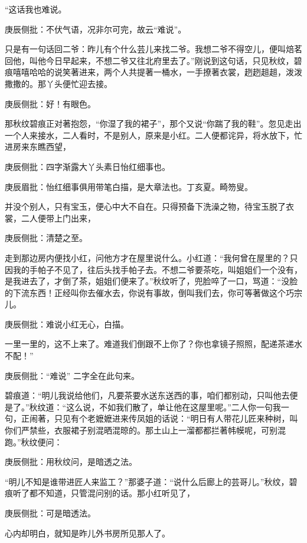 \begin{parag}


    “这话我也难说。\begin{note}庚辰侧批：不伏气语，况非尔可完，故云“难说”。\end{note}只是有一句话回二爷：昨儿有个什么芸儿来找二爷。我想二爷不得空儿，便叫焙茗回他，叫他今日早起来，不想二爷又往北府里去了。”刚说到这句话，只见秋纹，碧痕嘻嘻哈哈的说笑著进来，两个人共提著一桶水，一手撩著衣裳，趔趔趄趄，泼泼撒撒的。那丫头便忙迎去接。\begin{note}庚辰侧批：好！有眼色。\end{note}那秋纹碧痕正对著抱怨，“你湿了我的裙子”，那个又说“你踹了我的鞋”。忽见走出一个人来接水，二人看时，不是别人，原来是小红。二人便都诧异，将水放下，忙进房来东瞧西望，\begin{note}庚辰侧批：四字渐露大丫头素日怡红细事也。\end{note}\begin{note}庚辰眉批：怡红细事俱用带笔白描，是大章法也。丁亥夏。畸笏叟。\end{note}并没个别人，只有宝玉，便心中大不自在。只得预备下洗澡之物，待宝玉脱了衣裳，二人便带上门出来，\begin{note}庚辰侧批：清楚之至。\end{note}
\end{parag}


\begin{parag}


    走到那边房内便找小红，问他方才在屋里说什么。小红道：“我何曾在屋里的？只因我的手帕子不见了，往后头找手帕子去。不想二爷要茶吃，叫姐姐们一个没有，是我进去了，才倒了茶，姐姐们便来了。”秋纹听了，兜脸啐了一口，骂道：“没脸的下流东西！正经叫你去催水去，你说有事故，倒叫我们去，你可等著做这个巧宗儿。\begin{note}庚辰侧批：难说小红无心，白描。\end{note}一里一里的，这不上来了。难道我们倒跟不上你了？你也拿镜子照照，配递茶递水不配！”\begin{note}庚辰侧批：“难说” 二字全在此句来。\end{note}碧痕道：“明儿我说给他们，凡要茶要水送东送西的事，咱们都别动，只叫他去便是了。”秋纹道：“这么说，不如我们散了，单让他在这屋里呢。”二人你一句我一句，正闹著，只见有个老嬷嬷进来传凤姐的话说：“明日有人带花儿匠来种树，叫你们严禁些，衣服裙子别混晒混晾的。那土山上一溜都都拦著帏幙呢，可别混跑。”秋纹便问：\begin{note}庚辰侧批：用秋纹问，是暗透之法。\end{note}“明儿不知是谁带进匠人来监工？”那婆子道：“说什么后廊上的芸哥儿。”秋纹，碧痕听了都不知道，只管混问别的话。那小红听见了，\begin{note}庚辰侧批：可是暗透法。\end{note}心内却明白，就知是昨儿外书房所见那人了。
\end{parag}


